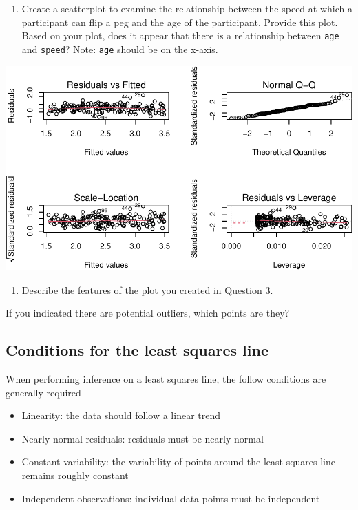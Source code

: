 \documentclass[
]{report}
\providecommand{\tightlist}{%
  \setlength{\itemsep}{0pt}\setlength{\parskip}{0pt}}
\begin{document}
\begin{enumerate}
\def\labelenumi{\arabic{enumi}.}
\setcounter{enumi}{2}
\tightlist
\item
  Create a scatterplot to examine the relationship between the speed at which a participant can flip a peg and the age of the participant. Provide this plot. Based on your plot, does it appear that there is a relationship between \texttt{age} and \texttt{speed}? Note: \texttt{age} should be on the x-axis.
\end{enumerate}

\begin{center}\includegraphics[width=0.7\linewidth]{10-regression_files/figure-latex/unnamed-chunk-2-1} \end{center}

\begin{enumerate}
\def\labelenumi{\arabic{enumi}.}
\setcounter{enumi}{3}
\tightlist
\item
  Describe the features of the plot you created in Question 3.
\end{enumerate}

\vspace{1in}

If you indicated there are potential outliers, which points are they?

\hypertarget{conditions-for-the-least-squares-line}{%
\subsection{Conditions for the least squares line}\label{conditions-for-the-least-squares-line}}

When performing inference on a least squares line, the follow conditions are generally required

\begin{itemize}
\tightlist
\item
  Linearity: the data should follow a linear trend
\item
  Nearly normal residuals: residuals must be nearly normal
\item
  Constant variability: the variability of points around the least squares line remains roughly constant
\item
  Independent observations: individual data points must be independent
\end{itemize}
\end{document}
